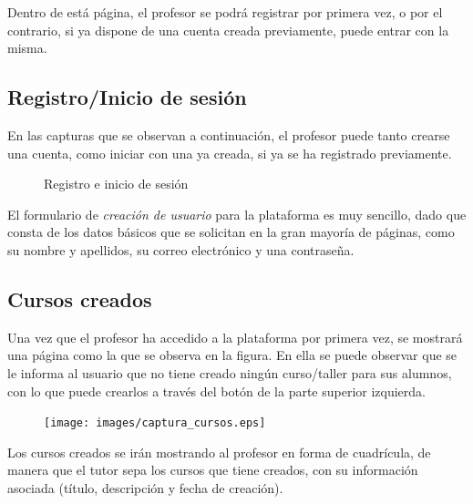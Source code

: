 Dentro de está página, el profesor se podrá registrar por primera vez, o por el contrario, si ya dispone de una cuenta creada previamente, puede entrar con la misma.


\subsection{Registro/Inicio de sesión}
\label{1:sec:2}

En las capturas que se observan a continuación, el profesor puede tanto crearse una cuenta, como iniciar con una ya creada, si ya se ha registrado previamente. 
\begin{figure}[!th]%
    \centering
    \qquad
    \caption{Registro e inicio de sesión}%
    \label{fig:12}%
\end{figure}

El formulario de \textit{creación de usuario} para la plataforma es muy sencillo, dado que consta de los datos básicos que se solicitan en la gran mayoría de páginas, como su nombre y apellidos, su correo electrónico y una contraseña.


\subsection{Cursos creados}
\label{1:sec:3}

Una vez que el profesor ha accedido a la plataforma por primera vez, se mostrará una página como la que se observa en la figura. En ella se puede observar que se le informa al usuario que no tiene creado ningún curso/taller para sus alumnos, 
con lo que puede crearlos a través del botón de la parte superior izquierda.

\newpage
\begin{figure}[!th]
\begin{center}
\texttt{[image: images/captura\_cursos.eps]}
\label{fig:13}
\end{center}
\end{figure}

Los cursos creados se irán mostrando al profesor en forma de cuadrícula, de manera que el tutor sepa los cursos que tiene creados, con su información asociada (título, descripción y fecha de creación).

